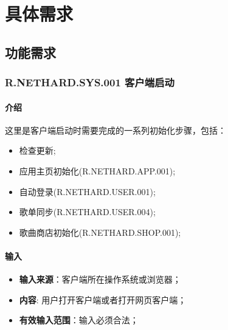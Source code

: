 \chapter{具体需求}
\section{功能需求}
\subsection{R.NETHARD.SYS.001 客户端启动}
\subsubsection{介绍}
这里是客户端启动时需要完成的一系列初始化步骤，包括：
\begin{itemize}
\item 检查更新;
\item 应用主页初始化(R.NETHARD.APP.001);
\item 自动登录(R.NETHARD.USER.001);
  \item 歌单同步(R.NETHARD.USER.004);
\item 歌曲商店初始化(R.NETHARD.SHOP.001);
\end{itemize}
\subsubsection{输入}


		
\begin{itemize}
\item \textbf{输入来源}：客户端所在操作系统或浏览器；
\item \textbf{内容}: 用户打开客户端或者打开网页客户端；
\item \textbf{有效输入范围}：输入必须合法；
\end{itemize}
